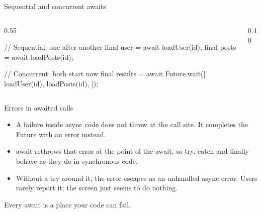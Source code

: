 \documentclass[10pt,aspectratio=169,t]{beamer}
\begin{document}
\begin{frame}[fragile,eyebrow=Async]{Sequential and concurrent awaits}
  \begin{columns}[T]
    \begin{column}{0.55\textwidth}
\begin{dart}
// Sequential: one after another
final user = await loadUser(id);
final posts = await loadPosts(id);

// Concurrent: both start now
final results = await Future.wait([
  loadUser(id),
  loadPosts(id),
]);
\end{dart}
    \end{column}
    \begin{column}{0.40\textwidth}
    \end{column}
  \end{columns}
\end{frame}

\begin{frame}[eyebrow=Async]{Errors in awaited calls}
  \vskip 2mm
  \begin{itemize}
    \item A failure inside async code does not throw at the call site. It completes the Future with an error instead.
    \item await rethrows that error at the point of the await, so try, catch and finally behave as they do in synchronous code.
    \item Without a try around it, the error escapes as an unhandled async error. Users rarely report it; the screen just seems to do nothing.
  \end{itemize}
  \begin{takeaway}{Every await is a place your code can fail.}
  \end{takeaway}
\end{frame}
\end{document}
